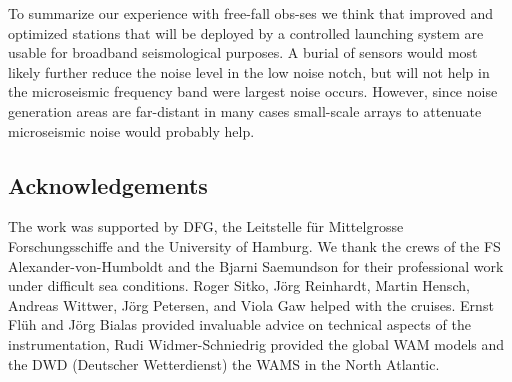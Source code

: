 \documentclass{article}
\begin{document}
{To summarize our experience with free-fall obs-ses we think 
that improved and optimized stations that will be deployed by 
a controlled launching system are usable for broadband seismological 
purposes. A burial of sensors would most likely further 
reduce 
the noise level in the low noise notch, but will not help in the 
microseismic frequency band were largest noise occurs.
However, since noise generation areas are far-distant in many cases 
small-scale arrays to attenuate microseismic noise 
would probably help.


\subsection*{Acknowledgements}
The work was supported by DFG, the Leitstelle f\"ur Mittelgrosse
Forschungsschiffe and the University of Hamburg.  We thank the crews
of the FS Alexander-von-Humboldt and the Bjarni Saemundson for their
professional work under difficult sea conditions.  Roger Sitko, J\"org
Reinhardt, Martin Hensch, Andreas Wittwer, J\"org Petersen,
and Viola Gaw helped with the cruises.  Ernst
Fl\"uh and J\"org Bialas provided invaluable advice on technical
aspects of the instrumentation, Rudi Widmer-Schniedrig provided the
global WAM models and the DWD (Deutscher Wetterdienst) the WAMS in the North Atlantic.


}
\end{document}
